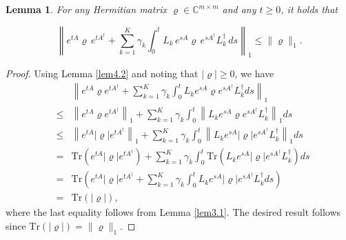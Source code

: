 \documentclass[preprint,3p,compress,12pt]{elsarticle}
\numberwithin{equation}{section}
\newtheorem{lemma}[theorem]{Lemma}
\numberwithin{figure}{section}
\begin{document}
\begin{lemma}\label{lem4.3}
  For any Hermitian matrix $\varrho\in \mathbb{C}^{m\times m}$ and any $t\geq0$, it holds that
\end{lemma}
\begin{equation}\label{equ4.1}
    \left\|e^{t A}\varrho \, e^{t A^{\dag}}+\sum_{k=1}^K\gamma_k
  \int_0^{t}L_k \, e^{sA}\varrho \, e^{sA^{\dag}} L_k^{\dag} \, ds\right\|_1\leq\|\varrho\|_1.
  \end{equation}
\begin{proof}
  Using Lemma \ref{lem4.2} and noting that $|\varrho|\geq0$, we have
  \begin{eqnarray*}
  &&\left\|e^{t A}\varrho e^{t A^{\dag}}+\sum_{k=1}^K\gamma_k
  \int_0^{t}L_ke^{sA}\varrho e^{sA^{\dag}} L_k^{\dag}ds\right\|_1\\
  &\leq& \left\|e^{t A}\varrho e^{t A^{\dag}}\right\|_1+\sum_{k=1}^K\gamma_k
  \int_0^{t}\left\|L_ke^{sA}\varrho e^{sA^{\dag}} L_k^{\dag}\right\|_1ds\\
  &\leq& \left\|e^{t A}|\varrho| e^{t A^{\dag}}\right\|_1+\sum_{k=1}^K\gamma_k
  \int_0^{t}\left\|L_ke^{sA}|\varrho| e^{sA^{\dag}} L_k^{\dag}\right\|_1ds\\
  &=&\mbox{Tr}\left(e^{t A}|\varrho| e^{t A^{\dag}}\right)+\sum_{k=1}^K\gamma_k
  \int_0^{t}\mbox{Tr}\left(L_ke^{sA}|\varrho| e^{sA^{\dag}} L_k^{\dag}\right)ds\\
  &=&\mbox{Tr}\left(e^{t A}|\varrho| e^{t A^{\dag}}+\sum_{k=1}^K\gamma_k
  \int_0^{t}L_ke^{sA}|\varrho| e^{sA^{\dag}} L_k^{\dag}ds\right)\\
  &=&\mbox{Tr}(|\varrho|),
  \end{eqnarray*}
  where the last equality follows from Lemma \ref{lem3.1}.
  The desired result follows since $\mbox{Tr}(|\varrho|)=\|\varrho\|_1$.
\end{proof}
\end{document}
